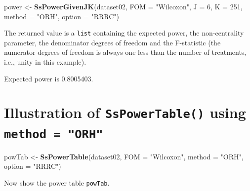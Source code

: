 \documentclass[]{book}
\newenvironment{Shaded}{\begin{snugshade}}{\end{snugshade}}
\newcommand{\CommentTok}[1]{\textcolor[rgb]{0.56,0.35,0.01}{\textit{#1}}}
\newcommand{\DataTypeTok}[1]{\textcolor[rgb]{0.13,0.29,0.53}{#1}}
\newcommand{\DecValTok}[1]{\textcolor[rgb]{0.00,0.00,0.81}{#1}}
\newcommand{\KeywordTok}[1]{\textcolor[rgb]{0.13,0.29,0.53}{\textbf{#1}}}
\newcommand{\NormalTok}[1]{#1}
\newcommand{\StringTok}[1]{\textcolor[rgb]{0.31,0.60,0.02}{#1}}
\begin{document}
\begin{Shaded}
\begin{Highlighting}[]
\NormalTok{power <-}\StringTok{ }\KeywordTok{SsPowerGivenJK}\NormalTok{(dataset02, }\DataTypeTok{FOM =} \StringTok{"Wilcoxon"}\NormalTok{, }\DataTypeTok{J =} \DecValTok{6}\NormalTok{, }\DataTypeTok{K =} \DecValTok{251}\NormalTok{, }\DataTypeTok{method =} \StringTok{"ORH"}\NormalTok{, }\DataTypeTok{option =} \StringTok{"RRRC"}\NormalTok{)}
\end{Highlighting}
\end{Shaded}

The returned value is a \texttt{list} containing the expected power, the non-centrality parameter, the denominator degrees of freedom and the F-statistic (the numerator degrees of freedom is always one less than the number of treatments, i.e., unity in this example).

\begin{Shaded}
\end{Shaded}

Expected power is 0.8005403.

\hypertarget{illustration-of-sspowertable-using-method-orh}{%
\section{\texorpdfstring{Illustration of \texttt{SsPowerTable()} using \texttt{method\ =\ "ORH"}}{Illustration of SsPowerTable() using method = "ORH"}}\label{illustration-of-sspowertable-using-method-orh}}

\begin{Shaded}
\begin{Highlighting}[]
\NormalTok{powTab <-}\StringTok{ }\KeywordTok{SsPowerTable}\NormalTok{(dataset02, }\DataTypeTok{FOM =} \StringTok{"Wilcoxon"}\NormalTok{, }\DataTypeTok{method =} \StringTok{"ORH"}\NormalTok{, }\DataTypeTok{option =} \StringTok{"RRRC"}\NormalTok{)}
\end{Highlighting}
\end{Shaded}

Now show the power table \texttt{powTab}.
\end{document}
